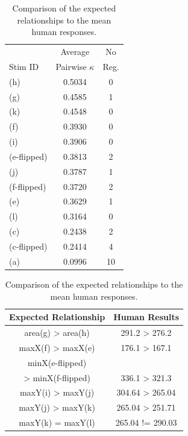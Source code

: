 \documentclass[11pt,letterpaper]{article}
\begin{document}
\begin{table}[t]
\parbox{.50\linewidth}{
\centering 
\begin{tabular}{l c c}
 & Average & No \\
Stim ID & Pairwise $\kappa$ & Reg.\\
\hline
\hline
(h) & 0.5034 & 0\\ %
(g) & 0.4585 & 1\\ %
(k) & 0.4548 & 0\\ %
(f) & 0.3930 & 0\\ %
(i) & 0.3906 & 0\\ %
(e-flipped) & 0.3813 & 2\\ %
(j) & 0.3787 & 1\\ %
(f-flipped) & 0.3720 & 2\\ %
(e) & 0.3629 & 1\\ %
(l) & 0.3164& 0\\ %
(c) & 0.2438 & 2\\ %
(c-flipped) & 0.2414 & 4\\ %
(a) & 0.0996 & 10 \\ %
\hline
\end{tabular}
\caption{The average pairwise $\kappa$ scores and the number of no region response by visual stimuli.}
\label{tab:stimuli-kappa-scores}
}
\hfill
\parbox{.50\linewidth}{
\centering
\begin{tabular}{c c}
Expected Relationship & Human Results  \\
\hline
\hline
area(g) > area(h) & 291.2 > 276.2\footnotemark[2] \\
maxX(f) > maxX(e) & 176.1 > 167.1 \\
minX(e-flipped)  &  \\
 > minX(f-flipped) & 336.1 > 321.3\footnotemark[2] \\
maxY(i) > maxY(j) & 304.64 > 265.04\footnotemark[2] \\
maxY(j) > maxY(k) & 265.04 > 251.71 \\
maxY(k) = maxY(l) & 265.04 != 290.03 \\
\hline
\end{tabular}
\caption{Comparison of the expected relationships to the mean human responses.}
\label{tab:region-location-tests}
}
\end{table}
\end{document}
